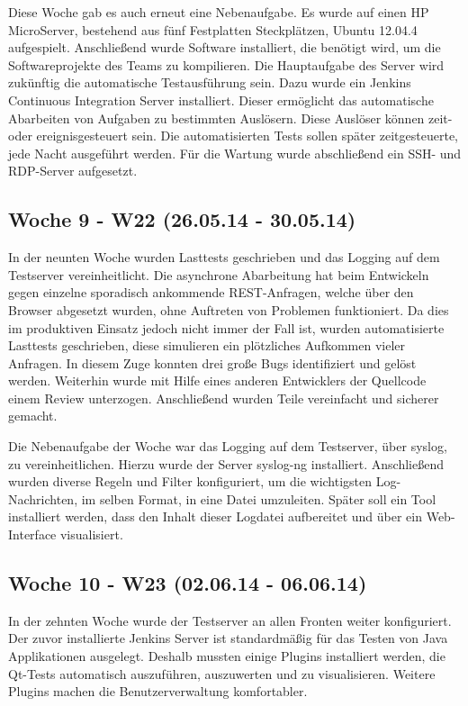 \documentclass{article}
\begin{document}
Diese Woche gab es auch erneut eine Nebenaufgabe. Es wurde auf einen HP MicroServer, bestehend aus fünf Festplatten Steckplätzen, Ubuntu 12.04.4 aufgespielt. Anschließend wurde Software installiert, die benötigt wird, um die Softwareprojekte des Teams zu kompilieren. Die Hauptaufgabe des Server wird zukünftig die automatische Testausführung sein. Dazu wurde ein Jenkins Continuous Integration Server installiert. Dieser ermöglicht das automatische Abarbeiten von Aufgaben zu bestimmten Auslösern. Diese Auslöser können zeit- oder ereignisgesteuert sein. Die automatisierten Tests sollen später zeitgesteuerte, jede Nacht ausgeführt werden. Für die Wartung wurde abschließend ein SSH- und RDP-Server aufgesetzt.

\subsection{Woche 9 - W22 (26.05.14 - 30.05.14)}

In der neunten Woche wurden Lasttests geschrieben und das Logging auf dem Testserver vereinheitlicht. Die asynchrone Abarbeitung hat beim Entwickeln gegen einzelne sporadisch ankommende REST-Anfragen, welche über den Browser abgesetzt wurden, ohne Auftreten von Problemen funktioniert. Da dies im produktiven Einsatz jedoch nicht immer der Fall ist, wurden automatisierte Lasttests geschrieben, diese simulieren ein plötzliches Aufkommen vieler Anfragen. In diesem Zuge konnten drei große Bugs identifiziert und gelöst werden. Weiterhin wurde mit Hilfe eines anderen Entwicklers der Quellcode einem Review unterzogen. Anschließend wurden Teile vereinfacht und sicherer gemacht.

Die Nebenaufgabe der Woche war das Logging auf dem Testserver, über syslog, zu vereinheitlichen. Hierzu wurde der Server syslog-ng installiert. Anschließend wurden diverse Regeln und Filter konfiguriert, um die wichtigsten Log-Nachrichten, im selben Format, in eine Datei umzuleiten. Später soll ein Tool installiert werden, dass den Inhalt dieser Logdatei aufbereitet und über ein Web-Interface visualisiert.	

\subsection{Woche 10 - W23 (02.06.14 - 06.06.14)}

In der zehnten Woche wurde der Testserver an allen Fronten weiter konfiguriert. Der zuvor installierte Jenkins Server ist standardmäßig für das Testen von Java Applikationen ausgelegt. Deshalb mussten einige Plugins installiert werden, die Qt-Tests automatisch auszuführen, auszuwerten und zu visualisieren. Weitere Plugins machen die Benutzerverwaltung komfortabler. 
\end{document}
